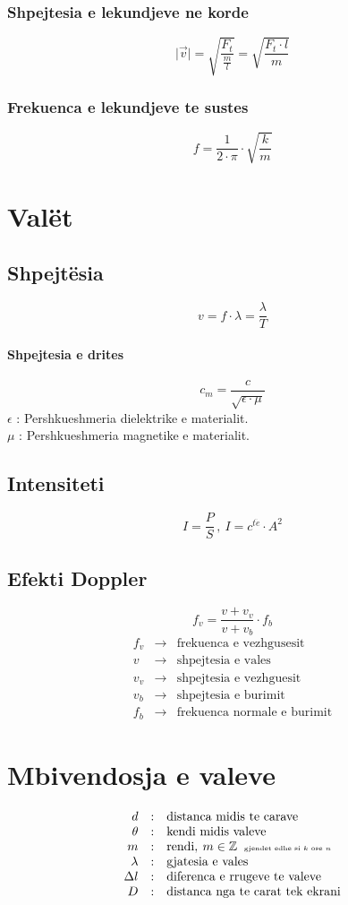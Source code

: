 \documentclass[a4paper, twocolumn]{article}
\begin{document}
\subsubsection{Shpejtesia e lekundjeve ne korde}
\[
	\mid \vec{v} \mid = \sqrt{\frac{F_t}{\frac{m}{l}}} = \sqrt{\frac{F_t\cdot l}{m}}
\]
\subsubsection{Frekuenca e lekundjeve te sustes}
\[
f = \frac{1}{2\cdot \pi} \cdot  \sqrt{\frac{k}{m}}
\]
\section{Valët}
\subsection{Shpejtësia}
\[
v=f\cdot \lambda = \frac{\lambda}{T}
\]
\paragraph{Shpejtesia e drites}
\[
c_m = \frac{c}{\sqrt{\epsilon \cdot \mu }}
\]
$\epsilon$ : Pershkueshmeria dielektrike e materialit.\\
$ \mu $ : Pershkueshmeria magnetike e materialit.
\subsection{Intensiteti}
\[
	I=\frac{P}{S} \, , \: I=c^{t\ddot{e}}\cdot A^2
\]
\subsection{Efekti Doppler}
\[
f_v=\frac{v+v_v}{v+v_b}\cdot f_b
\]
\[
	\begin{array}{rcl}
	f_v & \to & \textrm{frekuenca e vezhgusesit} \\
	v   & \to & \textrm{shpejtesia e vales} \\
	v_v & \to & \textrm{shpejtesia e vezhguesit} \\
	v_b & \to & \textrm{shpejtesia e burimit} \\
	f_b & \to & \textrm{frekuenca normale e burimit}
\end{array}
\]
\section{Mbivendosja e valeve}
\[
\begin{array}{rcl}
	d & : & \textrm{distanca midis te carave} \\
	\theta & : & \textrm{kendi midis valeve} \\
	m & : & \textrm{rendi},\: m \in \mathbb{Z}\;\; \textrm{\tiny{gjendet edhe si $k$ ose $n$}}\\
	\lambda & : & \textrm{gjatesia e vales}\\
	\Delta l & : & \textrm{diferenca e rrugeve te valeve}\\
	D & : & \textrm{distanca nga te carat tek ekrani}
\end{array}
\]
\end{document}
